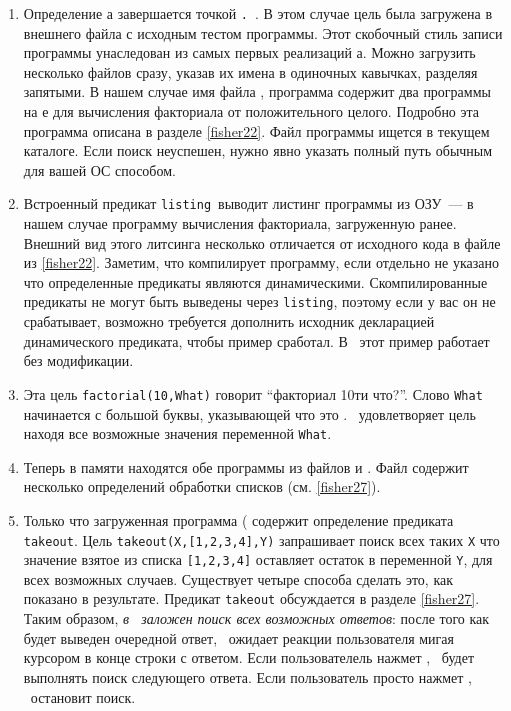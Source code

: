\begin{enumerate}
  \item
Определение  \prolog а завершается точкой \verb|.|\ .
В этом случае цель была загружена в внешнего файла с исходным тестом программы.
Этот скобочный стиль записи программы унаследован из самых первых реализаций
\prolog а. Можно загрузить несколько файлов сразу, указав их имена в одиночных
кавычках, разделяя запятыми. В нашем случае имя файла , программа
содержит два программы на \prolog е для вычисления факториала от положительного
целого. Подробно эта программа описана в разделе \ref{fisher22}. Файл программы
ищется в текущем каталоге. Если поиск неуспешен, нужно явно указать полный путь
обычным для вашей ОС способом.

\item 
Встроенный предикат \verb|listing|\ выводит листинг программы из ОЗУ\ --- в
нашем случае программу вычисления факториала, загруженную ранее. Внешний вид
этого литсинга несколько отличается от исходного кода в файле из \ref{fisher22}.
Заметим, что  компилирует программу, если отдельно не
указано что определенные предикаты являются динамическими. Скомпилированные
предикаты не могут быть выведены через \verb|listing|, поэтому если у вас он не
срабатывает, возможно требуется дополнить исходник декларацией динамического
предиката, чтобы пример сработал. В \ этот пример работает без
модификации.

  \item 
Эта цель \verb|factorial(10,What)| говорит ``факториал 10ти что?''. Слово
\verb|What| начинается с большой буквы, указывающей что это . \prolog\ удовлетворяет цель находя все
возможные значения переменной \verb|What|.

  \item
Теперь в памяти находятся обе программы из файлов  и
. Файл  содержит несколько определений обработки
списков (см. \ref{fisher27}).

  \item 
Только что загруженная программа ( содержит определение предиката
\verb|takeout|. Цель \verb|takeout(X,[1,2,3,4],Y)| запрашивает поиск всех таких
\verb|X| что значение взятое из списка \verb|[1,2,3,4]| оставляет остаток в
переменной \verb|Y|, для всех возможных случаев. Существует четыре способа
сделать это, как показано в результате.  Предикат \verb|takeout| обсуждается в
разделе \ref{fisher27}. Таким образом, \emph{в \prolog\ заложен поиск всех
возможных ответов}: после того как будет выведен очередной ответ, \prolog\
ожидает реакции пользователя мигая курсором в конце строки с ответом. Если
пользователель нажмет \keys{;}, \prolog\ будет выполнять поиск следующего
ответа. Если пользователь просто нажмет \keys{Enter}, \prolog\ остановит поиск.


\end{enumerate}
